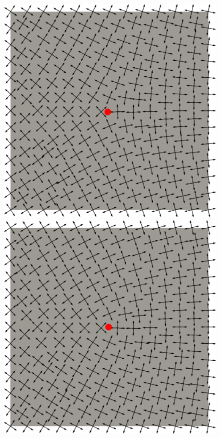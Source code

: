 \begin{figure}[!h]
  \centering
  \includegraphics[scale=0.1765]{images/index_-025.pdf}
  \hfill
  \includegraphics[scale=0.1765]{images/index_025.pdf}

\end{figure}
